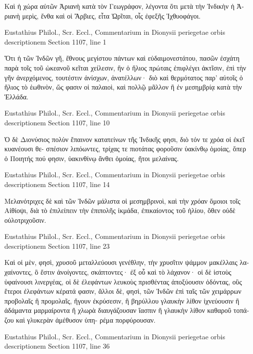 \documentclass[12pt,letterpaper,twoside,final]{memoir}
\begin{document}
\begin{greek}
                           Καὶ ἡ χώρα αὐτῶν Ἀριανὴ κατὰ 
τὸν Γεωγράφον, λέγοντα ὅτι μετὰ τὴν Ἰνδικὴν ἡ Ἀ-
ριανὴ μερὶς, ἔνθα καὶ οἱ Ἄρβιες, εἶτα Ὠρῖται, οἷς 
ἐφεξῆς Ἰχθυοφάγοι. 



Eustathius Philol., Scr. Eccl., Commentarium in Dionysii periegetae orbis descriptionem 
Section 1107, line 1

Ὅτι ἡ τῶν Ἰνδῶν γῆ, ἔθνους μεγίστου πάντων 
καὶ εὐδαιμονεστάτου, πασῶν ἐσχάτη παρὰ τοῖς τοῦ 
ὠκεανοῦ κεῖται χείλεσιν, ἣν ὁ ἥλιος πρώταις ἐπιφλέγει 
ἀκτῖσιν, ἐπὶ τὴν γῆν ἀνερχόμενος, τουτέστιν ἀνίσχων, 
ἀνατέλλων· διὸ καὶ θερμότατος παρ' αὐτοῖς ὁ ἥλιος τὸ 
ἑωθινὸν, ὥς φασιν οἱ παλαιοὶ, καὶ πολλῷ μᾶλλον ἢ ἐν 
μεσημβρίᾳ κατὰ τὴν Ἑλλάδα. 



Eustathius Philol., Scr. Eccl., Commentarium in Dionysii periegetae orbis descriptionem 
Section 1107, line 10

         Ὁ δὲ Διονύσιος πολὺν ἔπαινον κατατείνων τῆς 
Ἰνδικῆς φησι, διὸ τόν τε χρόα οἱ ἐκεῖ κυανέουσι θε-
σπέσιον λιπόωντες, τρίχας τε πιοτάτας φοροῦσιν ὑακίνθῳ 
ὁμοίας, ὅπερ ὁ Ποιητής πού φησιν, ὑακινθίνῳ ἄνθει 
ὁμοίας, ἤτοι μελαίνας. 



Eustathius Philol., Scr. Eccl., Commentarium in Dionysii periegetae orbis descriptionem 
Section 1107, line 14

        Μελανότριχες δὲ καὶ τῶν Ἰνδῶν μάλιστα οἱ 
μεσημβρινοὶ, καὶ τὴν χρόαν ὅμοιοι τοῖς Αἰθίοψι, διὰ 
τὸ ἐπιλείπειν τὴν ἐπιπολῆς ἰκμάδα, ἐπικαίοντος τοῦ 
ἡλίου, ὅθεν οὐδὲ οὐλοτριχοῦσιν. 



Eustathius Philol., Scr. Eccl., Commentarium in Dionysii periegetae orbis descriptionem 
Section 1107, line 23

      Καὶ οἱ μὲν, φησὶ, χρυσοῦ μεταλλεύουσι γενέθλην, 
τὴν χρυσῖτιν ψάμμον μακέλλαις λαχαίνοντες, ὃ ἔστιν 
ἀνοίγοντες, σκάπτοντες· ἐξ οὗ καὶ τὸ λάχανον· οἱ δὲ 
ἱστοὺς ὑφαίνουσι λινεργέας, οἱ δὲ ἐλεφάντων λευκοὺς 
πρισθέντας ἀποξύουσιν ὀδόντας, οὓς ἕτεροι ἐλεφάντων 
κέρατά φασιν, ἄλλοι δὲ, φησὶ, τῶν Ἰνδῶν ἐπὶ ταῖς τῶν 
χειμάρρων προβολαῖς ἢ προμολαῖς, ἤγουν ἐκρύσεσιν, 
ἢ βηρύλλου γλαυκὴν λίθον ἰχνεύουσιν ἢ ἀδάμαντα 
μαρμαίροντα ἢ χλωρὰ διαυγάζουσαν ἴασπιν ἢ γλαυκὴν 
λίθον καθαροῦ τοπάζου καὶ γλυκερὰν ἀμέθυσον ὑπη-
ρέμα πορφύρουσαν. 



Eustathius Philol., Scr. Eccl., Commentarium in Dionysii periegetae orbis descriptionem 
Section 1107, line 36


\end{greek}
\end{document}
